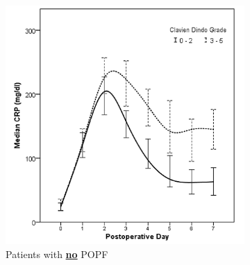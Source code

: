 \clearpage
\begin{figure}[t]
	\caption{Relationship between postoperative CRP and clinically significant infectious complications in patients without (A) and with (B) POPF.}
	\label{fig:crp_comp_infectious_leak}
	\centering
	\begin{subfigure}{0.48\textwidth}
		\centering
		\includegraphics[width=\textwidth]{Figures/crp_comp_infectious_leak0}
		\caption{Patients with \textbf{\underline{no}} POPF}
		\label{fig:crp_comp_infectious_leak0}
	\end{subfigure}
	\hfill
	\begin{subfigure}{0.48\textwidth}
		\centering

\end{subfigure}
\end{figure}
